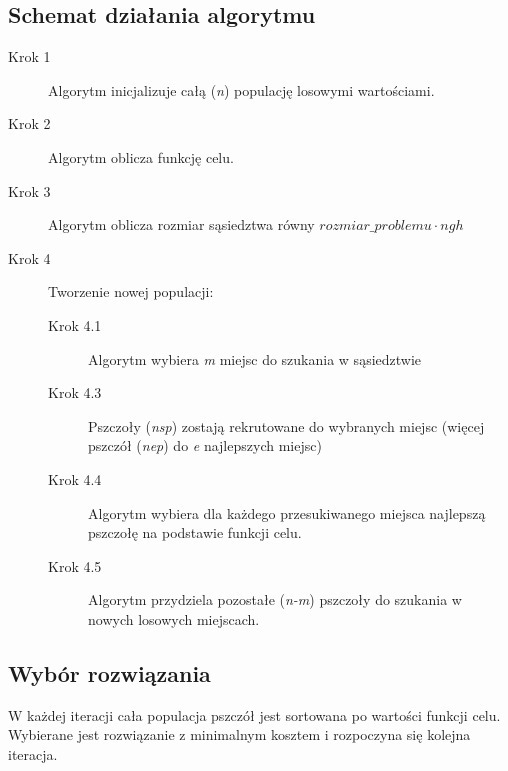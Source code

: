 \documentclass{article}
\begin{document}
\subsection{Schemat działania algorytmu} 
\begin{description}
 \item[Krok 1] Algorytm inicjalizuje całą (\emph{n}) populację losowymi wartościami.
 \item[Krok 2] Algorytm oblicza funkcję celu.
 \item[Krok 3] Algorytm oblicza rozmiar sąsiedztwa równy \begin{math}
                                                       rozmiar\_problemu \cdot ngh
                                                      \end{math}
 \item[Krok 4] Tworzenie nowej populacji:
\begin{description}
 \item [Krok 4.1] Algorytm wybiera \emph{m} miejsc do szukania w sąsiedztwie
 \item [Krok 4.3] Pszczoły (\emph{nsp})  zostają rekrutowane do wybranych miejsc (więcej pszczół (\emph{nep}) do \emph{e} najlepszych miejsc)
 \item [Krok 4.4] Algorytm wybiera dla każdego przesukiwanego miejsca najlepszą pszczołę na podstawie funkcji celu.
 \item [Krok 4.5] Algorytm przydziela pozostałe (\emph{n-m}) pszczoły do szukania w nowych losowych miejscach.\\
\end{description}


\end{description}


\subsection{Wybór rozwiązania}
W każdej iteracji cała populacja pszczół jest sortowana po wartości funkcji celu. Wybierane jest rozwiązanie z minimalnym kosztem i rozpoczyna się kolejna iteracja.
\end{document}
